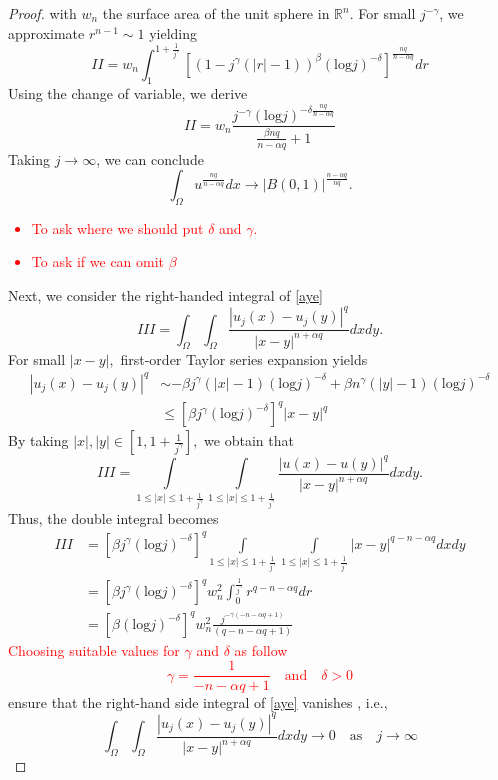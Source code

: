\documentclass[10pt,a4paper]{amsart}
\newcommand{\R}{\mathbb{R}}
\begin{document}
\begin{proof}
with $w_{n}$  the surface area of the unit sphere in $\R^{n}.$
For small $j^{-\gamma}$, we approximate $r^{n-1}\sim 1$ yielding
\[
II= w_{n}\int_{1}^{1+\frac{1}{j^{\gamma}}} [(1-j^{\gamma}(|r|-1))^{\beta}(\mathrm{log} j)^{-\delta}] ^{\frac{nq}{n-\alpha q}} dr
\]
Using the change of  variable, we derive
\[
II= w_{n}\frac{j^{-\gamma}(\mathrm{log}j)^{{-\delta}\frac{nq}{n-\alpha q}}}{\frac{\beta nq}{n-\alpha q}+1}
\]
Taking $j\to \infty$, we can conclude
\[
\int_{\Omega}u^{\frac{nq}{n-\alpha q}}dx\to |B(0,1)|^{\frac{n-\alpha q}{nq}}.
\]
\textcolor{red}{
\begin{itemize}
\item To ask where we should put $\delta$ and $\gamma.$
\item To ask if we can omit $\beta$
\end{itemize}
}
Next, we consider the right-handed integral of \eqref{aye}
\[
III=\int_{\Omega}\int_{\Omega}\frac{|u_{j}(x)-u_{j}(y)|^{q}}{|x-y|^{n+\alpha q}} dxdy.
\]
For small $|x-y|,$ first-order Taylor series expansion yields
\begin{align*}
|u_{j}(x)-u_{j}(y)|^{q}&\sim -\beta j^{\gamma}(|x|-1)(\mathrm{log}j)^{-\delta}+\beta n^{\gamma}(|y|-1)(\mathrm{log}j)^{-\delta}\\
&\leq [\beta j^{\gamma}(\mathrm{log}j)^{-\delta}]^{q}|x-y|^{q}
\end{align*}
By taking $|x|,|y|\in [1,1+\frac{1}{j^{\gamma}}],$ we obtain that
\[
III=\int\limits_{1\leq|x|\leq1+\frac{1}{j^{\gamma}}}\int\limits_{1\leq|x|\leq1+\frac{1}{j^{\gamma}}}\frac{|u(x)-u(y)|^{q}}{|x-y|^{n+\alpha q}} dxdy.
\]
Thus, the double integral becomes
\begin{align*}
III&=[\beta j^{\gamma}(\mathrm{log}j)^{-\delta}]^{q}\int\limits_{1\leq|x|\leq1+\frac{1}{j^{\gamma}}}\int\limits_{1\leq|x|\leq1+\frac{1}{j^{\gamma}}} |x-y|^{q-n-\alpha q} dxdy\\
&=[\beta j^{\gamma}(\mathrm{log}j)^{-\delta}]^{q} w_{n}^{2}\int_{0}^{\frac{1}{j^{\gamma}}}r^{q-n-\alpha q}dr\\
&=[\beta(\mathrm{log}j)^{-\delta}]^{q} w_{n}^{2}\frac{j^{-\gamma(-n-\alpha q+1)}}{(q-n-\alpha q+1)}
\end{align*}
\textcolor{red}{
Choosing suitable values for $\gamma$ and $\delta$ as follow
\[
\gamma=\frac{1}{-n-\alpha q+1}\quad\text{and}\quad  \delta>0
\]}
ensure that the right-hand side integral of \eqref{aye} vanishes , i.e.,
\[
\int_{\Omega}\int_{\Omega}\frac{|u_{j}(x)-u_{j}(y)|^{q}}{|x-y|^{n+\alpha q}} dxdy\to 0\quad\text{as}\quad j\to \infty
\]
\end{proof}
\end{document}
